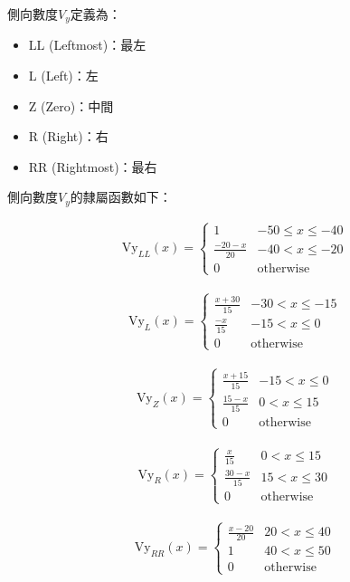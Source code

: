\documentclass[12pt]{article}       %
\begin{document}
側向數度$V_{y}$定義為：
\begin{itemize}
    \item LL (Leftmost)：最左
    \item L (Left)：左
    \item Z (Zero)：中間
    \item R (Right)：右
    \item RR (Rightmost)：最右
\end{itemize}

側向數度$V_{y}$的隸屬函數如下：

\begin{align}
    \text{Vy}_{LL}(x) = 
    \begin{cases}
    1 & -50 \le x \le -40 \\
    \frac{-20 - x}{20} & -40 < x \le -20 \\
    0 & \text{otherwise}
    \end{cases}       
\end{align}

\begin{align}
    \text{Vy}_{L}(x) = 
    \begin{cases}
    \frac{x + 30}{15} & -30 < x \le -15 \\
    \frac{-x}{15} & -15 < x \le 0 \\
    0 & \text{otherwise}
    \end{cases}    
\end{align}

\begin{align}
    \text{Vy}_{Z}(x) = 
    \begin{cases}
    \frac{x + 15}{15} & -15 < x \le 0 \\
    \frac{15 - x}{15} & 0 < x \le 15 \\
    0 & \text{otherwise}
    \end{cases}     
\end{align}

\begin{align}
    \text{Vy}_{R}(x) = 
    \begin{cases}
    \frac{x}{15} & 0 < x \le 15 \\
    \frac{30 - x}{15} & 15 < x \le 30 \\
    0 & \text{otherwise}
    \end{cases}     
\end{align}

\begin{align}
    \text{Vy}_{RR}(x) = 
    \begin{cases}
    \frac{x - 20}{20} & 20 < x \le 40 \\
    1 & 40 < x \le 50 \\
    0 & \text{otherwise}
    \end{cases}       
\end{align}
\end{document}
